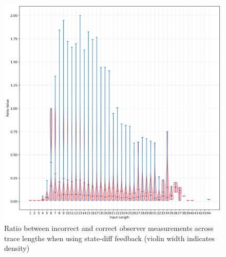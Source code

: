 \documentclass[twocolumn]{article}
\begin{document}
\begin{figure}
  \includegraphics[width=\columnwidth]{assets/consistency/state-diff-violin.png}
  \caption{Ratio between incorrect and correct observer measurements across trace lengths when using state-diff feedback (violin width indicates density)}
  \label{fig:state-diff-inter-violin}
\end{figure}
\end{document}
